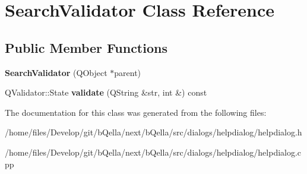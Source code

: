 \hypertarget{classSearchValidator}{
\section{SearchValidator Class Reference}
\label{classSearchValidator}
}
\subsection*{Public Member Functions}
\begin{DoxyCompactItemize}
\item 
\hypertarget{classSearchValidator_aed76d753310d3d1503e2f0e2bfea7566}{
{\bfseries SearchValidator} (QObject $\ast$parent)}
\label{classSearchValidator_aed76d753310d3d1503e2f0e2bfea7566}

\item 
\hypertarget{classSearchValidator_aa8e826a2bf8bb8d4af4c5b73ba2241c6}{
QValidator::State {\bfseries validate} (QString \&str, int \&) const }
\label{classSearchValidator_aa8e826a2bf8bb8d4af4c5b73ba2241c6}

\end{DoxyCompactItemize}


The documentation for this class was generated from the following files:\begin{DoxyCompactItemize}
\item 
/home/files/Develop/git/bQella/next/bQella/src/dialogs/helpdialog/helpdialog.h\item 
/home/files/Develop/git/bQella/next/bQella/src/dialogs/helpdialog/helpdialog.cpp\end{DoxyCompactItemize}
